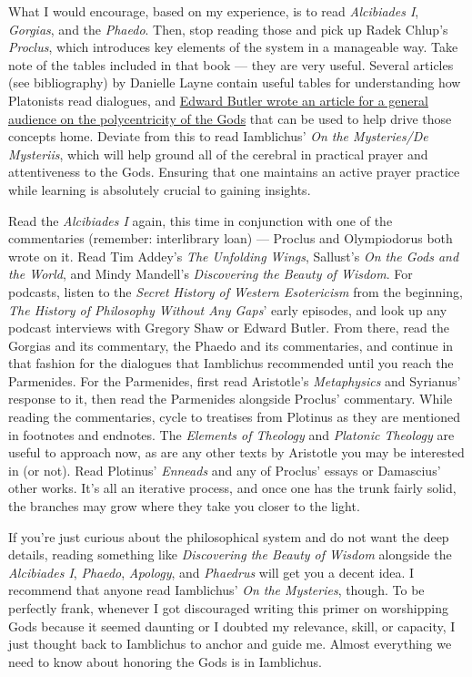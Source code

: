 \documentclass[
]{book}
\begin{document}
What I would encourage, based on my experience, is to read \emph{Alcibiades I}, \emph{Gorgias}, and the \emph{Phaedo}. Then, stop reading those and pick up Radek Chlup's \emph{Proclus}, which introduces key elements of the system in a manageable way. Take note of the tables included in that book --- they are very useful. Several articles (see bibliography) by Danielle Layne contain useful tables for understanding how Platonists read dialogues, and \href{https://www.academia.edu/30296722/_Polycentric_Polytheism_pp._37-40_in_Witches_and_Pagans_32_June_2016}{Edward Butler wrote an article for a general audience on the polycentricity of the Gods} that can be used to help drive those concepts home. Deviate from this to read Iamblichus' \emph{On the Mysteries/De Mysteriis}, which will help ground all of the cerebral in practical prayer and attentiveness to the Gods. Ensuring that one maintains an active prayer practice while learning is absolutely crucial to gaining insights.

Read the \emph{Alcibiades I} again, this time in conjunction with one of the commentaries (remember: interlibrary loan) --- Proclus and Olympiodorus both wrote on it. Read Tim Addey's \emph{The Unfolding Wings}, Sallust's \emph{On the Gods and the World}, and Mindy Mandell's \emph{Discovering the Beauty of Wisdom}. For podcasts, listen to the \emph{Secret History of Western Esotericism} from the beginning, \emph{The History of Philosophy Without Any Gaps}' early episodes, and look up any podcast interviews with Gregory Shaw or Edward Butler. From there, read the Gorgias and its commentary, the Phaedo and its commentaries, and continue in that fashion for the dialogues that Iamblichus recommended until you reach the Parmenides. For the Parmenides, first read Aristotle's \emph{Metaphysics} and Syrianus' response to it, then read the Parmenides alongside Proclus' commentary. While reading the commentaries, cycle to treatises from Plotinus as they are mentioned in footnotes and endnotes. The \emph{Elements of Theology} and \emph{Platonic Theology} are useful to approach now, as are any other texts by Aristotle you may be interested in (or not). Read Plotinus' \emph{Enneads} and any of Proclus' essays or Damascius' other works. It's all an iterative process, and once one has the trunk fairly solid, the branches may grow where they take you closer to the light.

If you're just curious about the philosophical system and do not want the deep details, reading something like \emph{Discovering the Beauty of Wisdom} alongside the \emph{Alcibiades I}, \emph{Phaedo}, \emph{Apology}, and \emph{Phaedrus} will get you a decent idea. I recommend that anyone read Iamblichus' \emph{On the Mysteries}, though. To be perfectly frank, whenever I got discouraged writing this primer on worshipping Gods because it seemed daunting or I doubted my relevance, skill, or capacity, I just thought back to Iamblichus to anchor and guide me. Almost everything we need to know about honoring the Gods is in Iamblichus.
\end{document}
